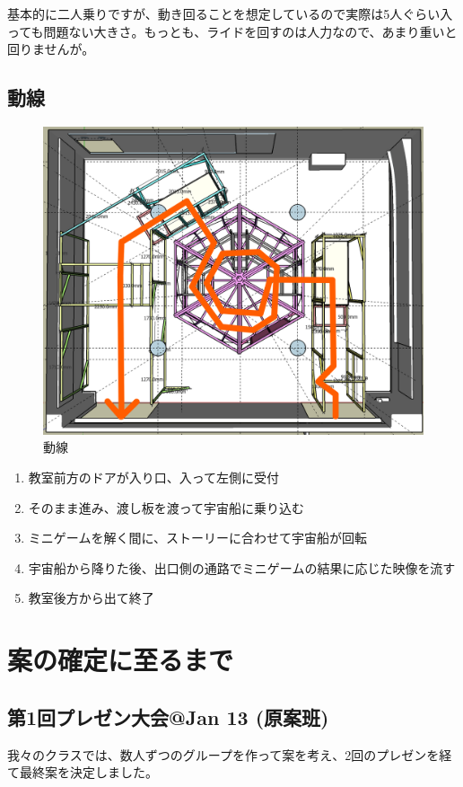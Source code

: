 \documentclass{jsarticle}
\makeatletter
\newenvironment{imageHere}[2][htbp]{\def\@imageHereTmp{#2}%
    \begin{figure}[#1]
        \centering
}{%
        \caption{\@imageHereTmp}
        \label{fig:\@imageHereTmp}
    \end{figure}
}
\makeatother
\begin{document}
基本的に二人乗りですが、動き回ることを想定しているので実際は5人ぐらい入っても問題ない大きさ。もっとも、ライドを回すのは人力なので、あまり重いと回りませんが。

\clearpage

\subsection{動線}

\begin{imageHere}{動線}
    \includegraphics[width=0.6\linewidth]{images/plan_overview/lane.png}
\end{imageHere}

\begin{enumerate}
    \item 教室前方のドアが入り口、入って左側に受付
    \item そのまま進み、渡し板を渡って宇宙船に乗り込む
    \item ミニゲームを解く間に、ストーリーに合わせて宇宙船が回転
    \item 宇宙船から降りた後、出口側の通路でミニゲームの結果に応じた映像を流す
    \item 教室後方から出て終了
\end{enumerate}

\clearpage

\section{案の確定に至るまで}

\subsection{第1回プレゼン大会@Jan 13 (原案班)}

我々のクラスでは、数人ずつのグループを作って案を考え、2回のプレゼンを経て最終案を決定しました。
\end{document}
